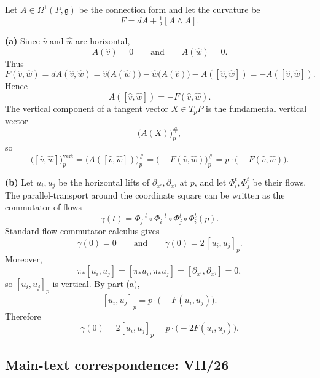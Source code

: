 \begin{solution}
Let $A\in\Omega^1(P,\mathfrak{g})$ be the connection form and let the curvature be
\[
F=dA+\tfrac12[A\wedge A].
\]

\textbf{(a)}
Since $\hat v$ and $\hat w$ are horizontal,
\[
A(\hat v)=0
\qquad\text{and}\qquad
A(\hat w)=0.
\]
Thus
\[
F(\hat v,\hat w)
=
dA(\hat v,\hat w)
=
\hat v\bigl(A(\hat w)\bigr)-\hat w\bigl(A(\hat v)\bigr)-A([\hat v,\hat w])
=
-A([\hat v,\hat w]).
\]
Hence
\[
A([\hat v,\hat w])=-F(\hat v,\hat w).
\]
The vertical component of a tangent vector $X\in T_pP$ is the fundamental vertical vector
\[
\bigl(A(X)\bigr)^\#_p,
\]
so
\[
\bigl([\hat v,\hat w]\bigr)^{\mathrm{vert}}_p
=
\bigl(A([\hat v,\hat w])\bigr)^\#_p
=
\bigl(-F(\hat v,\hat w)\bigr)^\#_p
=
p\cdot\bigl(-F(\hat v,\hat w)\bigr).
\]

\textbf{(b)}
Let $u_i,u_j$ be the horizontal lifts of $\partial_{x^i},\partial_{x^j}$ at $p$, and let $\Phi_i^t,\Phi_j^t$ be their flows.
The parallel-transport around the coordinate square can be written as the commutator of flows
\[
\gamma(t)
=
\Phi_j^{-t}\circ \Phi_i^{-t}\circ \Phi_j^{t}\circ \Phi_i^{t}(p).
\]
Standard flow-commutator calculus gives
\[
\dot\gamma(0)=0
\qquad\text{and}\qquad
\ddot\gamma(0)=2\,[u_i,u_j]_p.
\]
Moreover,
\[
\pi_*[u_i,u_j]=[\pi_*u_i,\pi_*u_j]=[\partial_{x^i},\partial_{x^j}]=0,
\]
so $[u_i,u_j]_p$ is vertical. By part (a),
\[
[u_i,u_j]_p
=
p\cdot\bigl(-F(u_i,u_j)\bigr).
\]
Therefore
\[
\ddot\gamma(0)
=
2[u_i,u_j]_p
=
p\cdot\bigl(-2F(u_i,u_j)\bigr).
\]

\end{solution}

\subsection*{Main-text correspondence: VII/26}

